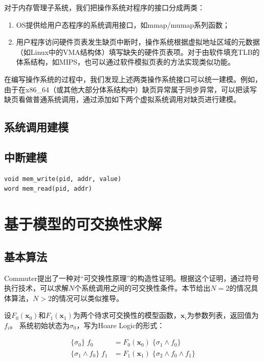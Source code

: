 对于内存管理子系统，我们把操作系统对程序的接口分成两类：
\begin{enumerate}
\item OS提供给用户态程序的系统调用接口，如mmap/mumap系列函数；
\item 用户程序访问硬件页表发生缺页中断时，操作系统根据虚拟地址区域的元数据（如Linux中的VMA结构体）填写缺失的硬件页表项。对于由软件填充TLB的体系结构，如MIPS，也可以通过软件模拟页表的方法实现类似功能。
\end{enumerate}

在编写操作系统的过程中，我们发现上述两类操作系统接口可以统一建模。例如，由于在x86\_64（或其他大部分体系结构中）缺页异常属于同步异常\cite{intelsys}，可以把读写缺页看做普通系统调用，通过添加如下两个虚拟系统调用对缺页进行建模。

\subsection{系统调用建模}

\subsection{中断建模}

\begin{verbatim}
void mem_write(pid, addr, value)
word mem_read(pid, addr)
\end{verbatim}

\section{基于模型的可交换性求解}

\subsection{基本算法}
\label{subsec:comm-alg}
Commuter\cite{commuter:2013}提出了一种对``可交换性原理''的构造性证明。根据这个证明，通过符号执行技术，可以求解$N$个系统调用之间的可交换性条件。本节给出$N=2$的情况具体算法，$N
> 2$的情况可以类似推导。

设$F_0(\boldsymbol{x}_0)$和$F_1(\boldsymbol{x}_1)$为两个待求可交换性的模型函数，$\boldsymbol{x}_i$为参数列表，返回值为$f_i$。
系统初始状态为$\sigma_0$，写为Hoare Logic\cite{Hoare:ABC:363235.363259}的形式：

\begin{equation}
\label{eq:hoare1}
\begin{aligned}
\{ \sigma_0 \} \; f_0 &= F_0(\boldsymbol{x}_0) \; \{\sigma_1 \land f_0 \} \\
\{ \sigma_1 \land f_0 \} \; f_1 &= F_1(\boldsymbol{x}_1) \; \{\sigma_2 \land f_0 \land
	f_1 \}
\end{aligned}
\end{equation}

